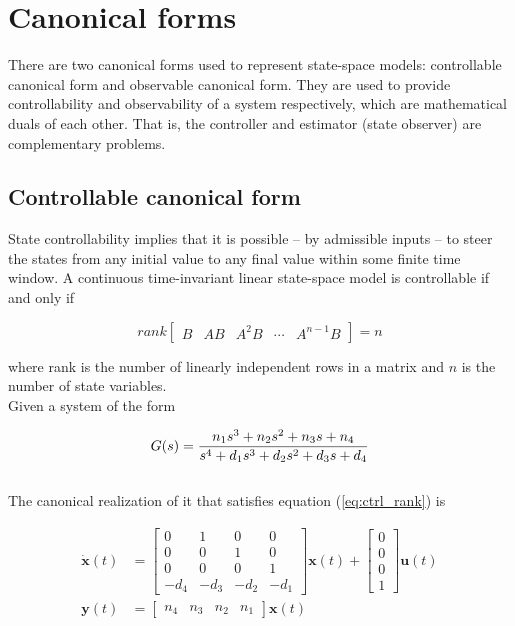\documentclass[10pt,conference,compsoc]{IEEEtran}
\newcommand{\mtx}[1] {\bm #1}
\begin{document}
\section{Canonical forms}

There are two canonical forms used to represent state-space models: controllable
canonical form and observable canonical form. They are used to provide
controllability and observability of a system respectively, which are
mathematical duals of each other. That is, the controller and estimator (state
observer) are complementary problems.

\subsection{Controllable canonical form} \label{subsec:ctrl_canon}

State controllability implies that it is possible -- by admissible inputs -- to
steer the \glspl{state} from any initial value to any final value within some
finite time window. A continuous \gls{time-invariant} linear state-space model
is controllable if and only if

\begin{equation}
  rank \left[
  \begin{array}{ccccc}
    B & AB & A^2B & \cdots & A^{n-1}B
  \end{array}
  \right] = n
  \label{eq:ctrl_rank}
\end{equation}

where rank is the number of linearly independent rows in a matrix and $n$ is the
number of \gls{state} variables. \\

Given a \gls{system} of the form

\begin{equation} \label{eq:ctrl_obsv_tf}
  G(s) = \frac{n_1 s^3 + n_2 s^2 + n_3 s + n_4}
    {s^4 + d_1 s^3 + d_2 s^2 + d_3 s + d_4} \\
\end{equation}
\\
The canonical realization of it that satisfies equation (\ref{eq:ctrl_rank}) is

\begin{align}
  \dot{\mtx{x}}(t) &= \left[
  \begin{array}{cccc}
    0 & 1 & 0 & 0 \\
    0 & 0 & 1 & 0 \\
    0 & 0 & 0 & 1 \\
    -d_4 & -d_3 & -d_2 & -d_1
  \end{array}
  \right] \mtx{x}(t) + \left[
  \begin{array}{c}
    0 \\
    0 \\
    0 \\
    1
  \end{array}
  \right] \mtx{u}(t) \\
  \mtx{y}(t) &= \left[
  \begin{array}{cccc}
    n_4 & n_3 & n_2 & n_1
  \end{array}
  \right] \mtx{x}(t)
\end{align}
\end{document}
